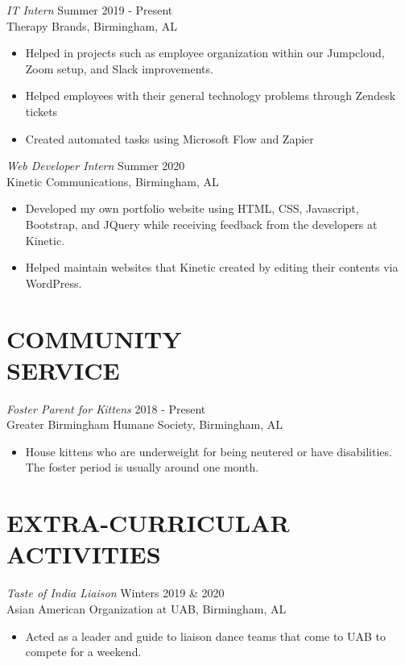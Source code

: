\documentclass[margin, 10pt]{res} %
\begin{document}
\begin{resume}
{\sl IT Intern} \hfill Summer 2019 - Present \\
Therapy Brands, Birmingham, AL 
\begin{itemize} \itemsep -2pt %
\item Helped in projects such as employee organization within our Jumpcloud, Zoom setup, and Slack improvements.
\item Helped employees with their general technology problems through Zendesk tickets
\item Created automated tasks using Microsoft Flow and Zapier
\end{itemize} 

{\sl Web Developer Intern} \hfill Summer 2020 \\
Kinetic Communications, Birmingham, AL
\begin{itemize} \itemsep -2pt %
\item Developed my own portfolio website using HTML, CSS, Javascript, Bootstrap, and JQuery while receiving feedback from the developers at Kinetic. 
\item Helped maintain websites that Kinetic created by editing their contents via WordPress. 
\end{itemize}

\section{COMMUNITY \\ SERVICE}

{\sl Foster Parent for Kittens} \hfill 2018 - Present \\
Greater Birmingham Humane Society, Birmingham, AL
\begin{itemize}
\item House kittens who are underweight for being neutered or have disabilities. The foster period is usually around one month.
\end{itemize}


\section{EXTRA-CURRICULAR \\ ACTIVITIES} 

{\sl Taste of India Liaison} \hfill Winters 2019 \& 2020 \\
Asian American Organization at UAB, Birmingham, AL
\begin{itemize}
\item Acted as a leader and guide to liaison dance teams that come to UAB to compete for a weekend.
\end{itemize}


\end{resume}
\end{document}
